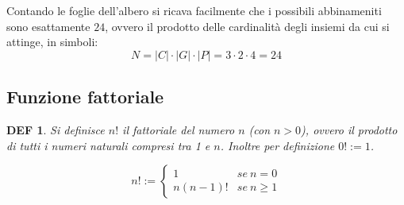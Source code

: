 \documentclass{article}     %
\newtheorem*{definition}{DEF}
\begin{document}
            
            Contando le foglie dell'albero si ricava facilmente che i possibili abbinameniti sono esattamente $24$, ovvero il prodotto delle cardinalità degli insiemi da cui si attinge, in simboli:
            \[N=|C|\cdot|G|\cdot|P|=3\cdot2\cdot4=24\]
        \subsection{Funzione fattoriale}
            \begin{definition}
                Si definisce $n!$ il fattoriale del numero $n$ (con $n>0$), ovvero il prodotto di tutti i numeri naturali compresi tra 1 e $n$. Inoltre per definizione $0!:=1$.
            \end{definition}
            \[n!:=\left\{\begin{array}{cc}
                 1  & se ~n=0\\
                 n(n-1)! & se ~n\geq 1
            \end{array}\right.\]
            
\end{document}
